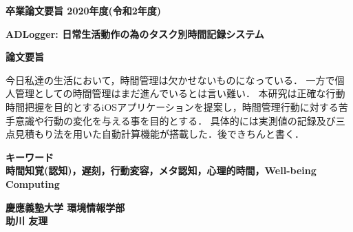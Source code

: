\begin{center}
\textbf{\Large 卒業論文要旨 2020年度(令和2年度)}

\vspace{6.18mm}

\textbf{\Large ADLogger: 日常生活動作の為のタスク別時間記録システム}
\end{center}

\vspace{10mm}

\begin{flushleft}
\textbf{論文要旨}\\
\end{flushleft}
今日私達の生活において，時間管理は欠かせないものになっている．
一方で個人管理としての時間管理はまだ進んでいるとは言い難い．
本研究は正確な行動時間把握を目的とするiOSアプリケーションを提案し，時間管理行動に対する苦手意識や行動の変化を与える事を目的とする．
具体的には実測値の記録及び三点見積もり法を用いた自動計算機能が搭載した．後できちんと書く．




\begin{flushleft}
\textbf{キーワード}\\
\textbf{時間知覚(認知)，遅刻，行動変容，メタ認知，心理的時間，Well-being Computing}

\end{flushleft}

\begin{flushright}
\textbf{慶應義塾大学 環境情報学部}\\
\textbf{助川 友理}
\end{flushright}
\newpage

